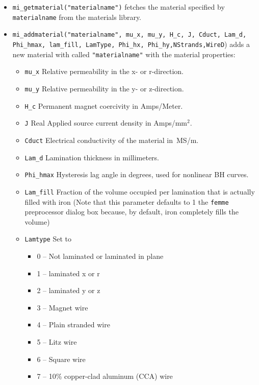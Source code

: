 \begin{itemize}
\item \texttt{mi\_getmaterial("materialname")} fetches the material specified by \texttt{materialname} 
from the materials library.

\item{\tt mi\_addmaterial("materialname", mu{\_}x, mu{\_}y, H{\_}c,
J, Cduct, Lam{\_}d, Phi{\_}hmax, lam{\_}fill, LamType, Phi{\_}hx, Phi{\_}hy,NStrands,WireD}) adds a
new material with called {\tt "materialname"} with the material
properties:
        \begin{itemize}
        \item{\tt mu{\_}x} Relative permeability in the x- or r-direction.
        \item{\tt mu{\_}y} Relative permeability in the y- or z-direction.
        \item{\tt H{\_}c} Permanent magnet coercivity in
        Amps/Meter.
        \item{\tt J} Real Applied source current density in Amps/mm$^2$.
        \item{\tt Cduct} Electrical conductivity of the material
        in~MS/m.
        \item{\tt Lam{\_}d} Lamination thickness in millimeters.
        \item{\tt Phi\_hmax} Hysteresis lag angle in degrees, used for nonlinear BH curves.
        \item{\tt Lam{\_}fill} Fraction of the volume occupied per lamination that
        is actually filled with iron (Note that this parameter defaults to 1 the
        {\tt femme} preprocessor dialog box because, by default, iron completely
        fills the volume)
        \item{\tt Lamtype} Set to
                \begin{itemize}
                \item 0 -- Not laminated or laminated in plane
                \item 1 -- laminated x or r
                \item 2 -- laminated y or z
                                \item 3 -- Magnet wire
                                \item 4 -- Plain stranded wire
                                \item 5 -- Litz wire
                                \item 6 -- Square wire
                                \item 7 -- 10\% copper-clad aluminum (CCA) wire

\end{itemize}
\end{itemize}
\end{itemize}
